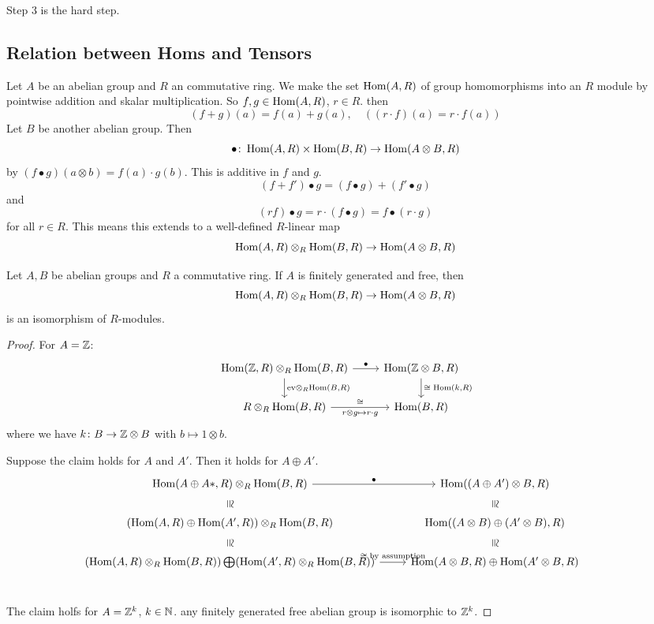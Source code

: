 \documentclass[language=english]{TemplateLecture}
\begin{document}
Step 3 is the hard step.

\subsection{Relation between Homs and Tensors}

Let \(A\) be an abelian group and \(R\) an commutative ring. We make the set \(\operatorname{Hom}(A,R)\) of group homomorphisms into an \(R\) module by pointwise addition and skalar multiplication. So \(f,g \in \operatorname{Hom}(A,R)\), \(r \in R\). then
\[(f+g)(a) = f(a) + g(a), \quad ((r\cdot f)(a) = r\cdot f(a))\]
Let \(B\) be another abelian group. Then
\[\bullet \colon \operatorname{Hom}(A,R) \times \operatorname{Hom}(B,R) \to \operatorname{Hom}(A\otimes B, R)\]
by \((f\bullet g)(a\otimes b) = f(a) \cdot g(b)\). This is additive in \(f\) and \(g\).
\[(f+f') \bullet g = (f\bullet g) + (f' \bullet g)\]
and
\[(rf) \bullet g = r \cdot (f\bullet g) = f \bullet (r\cdot g)\]
for all \(r \in R\).
This means this extends to a well-defined \(R\)-linear map
\[\operatorname{Hom}(A,R) \otimes_R \operatorname{Hom}(B,R) \to \operatorname{Hom}(A\otimes B, R)\]
\begin{proposition}
    Let \(A,B\) be abelian groups and \(R\) a commutative ring. If \(A\) is finitely generated and free, then
    \[\operatorname{Hom}(A, R) \otimes_R \operatorname{Hom}(B,R) \to \operatorname{Hom}(A\otimes B, R)\]
    is an isomorphism of \(R\)-modules.
\end{proposition}

\begin{proof}
    For \(A = \mathbb{Z}\):
    \[\begin{tikzcd}
        {\Hom(\IZ,R) \otimes_R \Hom(B,R)} \ar[r, "\bullet"] \ar[d, "{\mathrm{ev} \otimes_R \Hom(B,R)}"] & {\Hom(\IZ\otimes B, R)} \ar[d, "{\cong \; \Hom(k,R)}"]\\
        {R \otimes_R \Hom(B,R)} \ar[r, "\cong", "r\otimes g \mapsto r\cdot g"'] & {\Hom(B,R)}
    \end{tikzcd}\]
    where we have \(k \colon B \to \mathbb{Z} \otimes B\) with \(b\mapsto 1 \otimes b\).

    Suppose the claim holds for \(A\) and \(A'\). Then it holds for \(A \oplus A'\).
    \[\begin{tikzcd}
        {\Hom(A\oplus A*, R) \otimes_R \Hom(B,R)} \ar[r, "\bullet"] \ar[d, phantom, sloped, "\cong"]& {\Hom((A\oplus A') \otimes B, R)} \ar[d, phantom, sloped, "\cong"] \\
        {(\Hom(A,R) \oplus \Hom(A',R)) \otimes_R \Hom(B,R)} \ar[d, phantom, sloped, "\cong"] & {\Hom((A\otimes B) \oplus (A' \otimes B), R)} \ar[d, phantom, sloped, "\cong"]\\
        {(\Hom(A,R) \otimes_R \Hom(B,R)) \bigoplus (\Hom(A',R) \otimes_R \Hom(B,R))} \ar[r, "\cong \; \text{by assumption}"]&  {\Hom(A\otimes B, R) \oplus \Hom(A' \otimes B, R)} &\\
    \end{tikzcd}\]

    The claim holfs for \(A = \mathbb{Z}^k\), \(k \in \mathbb{N}\). any finitely generated free abelian group is isomorphic to \(\mathbb{Z}^k\).
\end{proof}
\end{document}
